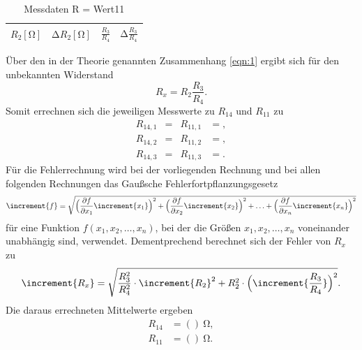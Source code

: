 \begin{table}
  \centering
  \caption{Messdaten R = Wert11}
  \label{tab:2}
  \begin{tabular}{c c c c}
    \toprule
    {$R_2 [\si{\ohm}]$} & {$\increment R_2 [\si{\ohm}]$} & {$\frac{R_3}{R_4}$} & {$\increment \frac{R_3}{R_4}$} \\
    \midrule
    
    \bottomrule
  \end{tabular}
\end{table}
Über den in der Theorie genannten Zusammenhang \ref{eqn:1} ergibt sich für den unbekannten Widerstand
\begin{equation}
  R_x = R_2 \frac{R_3}{R_4}.
\end{equation}
Somit errechnen sich die jeweiligen Messwerte zu $R_{14}$ und $R_{11}$ zu
\begin{align*}
  R_{14,1}   &=  & R_{11,1} &= ,\\
  R_{14,2}   &=  & R_{11,2} &= ,\\
  R_{14,3}   &=  & R_{11,3} &= .
\end{align*}
Für die Fehlerrechnung wird bei der vorliegenden Rechnung und bei allen folgenden Rechnungen das Gaußsche Fehlerfortpflanzungsgesetz
\begin{equation}
\increment{f} = \sqrt{\Bigl(\frac{\partial f}{\partial x_1}\increment{x_1}\Bigr)^2 + \Bigl(\frac{\partial f}{\partial x_2}\increment{x_2}\Bigr)^2 + \dotsc + \Bigl(\frac{\partial f}{\partial x_n}\increment{x_n}\Bigr)^2}
\end{equation}
für eine Funktion $f(x_1,x_2, \dotsc ,x_n)$, bei der die Größen $x_1, x_2, \dotsc , x_n$ voneinander unabhängig sind, verwendet.
Dementprechend berechnet sich der Fehler von $R_x$ zu
\begin{equation}
\increment{R_x} = \sqrt{\frac{R_3^2}{R_4^2} \cdot \increment{R_2}^2 + R_2^2 \cdot \Bigl(\increment{\frac{R_3}{R_4} }\Bigr)^2}.
  \label{eqn:fehler1}
\end{equation}
Die daraus errechneten Mittelwerte ergeben
\begin{align*}
  R_{14}   &= ()\:\si{\ohm},\\
  R_{11}   &= ()\:\si{\ohm}.
\end{align*}

